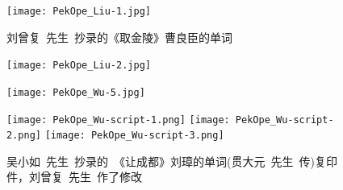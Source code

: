 \newpage
\begin{figure}[h!]
\centering
\vspace{-0.6in}
\texttt{[image: PekOpe\_Liu-1.jpg]}
\caption*{\hei 刘曾复~先生~抄录的《取金陵》曹良臣的单词}
\label{Liu-Script}
\end{figure}
\vspace{30pt}
\begin{figure}[hbtp!]
\hspace*{-0.5in}
\begin{minipage}[t]{0.53\textwidth}
	\centering
	\texttt{[image: PekOpe\_Liu-2.jpg]}
	\caption*{\hei \fontsize{8.5pt}{4.0pt}\selectfont{左:~刘曾复~先生~保存的部分说戏录音磁带}}
\end{minipage}
\hspace{0.6in}
\begin{minipage}[t]{0.43\textwidth}
	\centering
	\vspace{-3.7in}
	\texttt{[image: PekOpe\_Wu-5.jpg]}
	\caption*{\hei \fontsize{8.5pt}{4.0pt}\selectfont{右:吴小如~先生~保存的各类说戏录音磁带}}
\end{minipage}
\label{Records}
\end{figure}
\newpage
\begin{figure}[h!]
\centering
\vspace{-0.6in}
	\texttt{[image: PekOpe\_Wu-script-1.png]}
	\texttt{[image: PekOpe\_Wu-script-2.png]}
	\texttt{[image: PekOpe\_Wu-script-3.png]}
%
\caption*{\hei 吴小如~先生~抄录的~《让成都》刘璋的单词(贯大元~先生~传)复印件，刘曾复~先生~作了修改}
\label{Wu-Script}
\end{figure}


